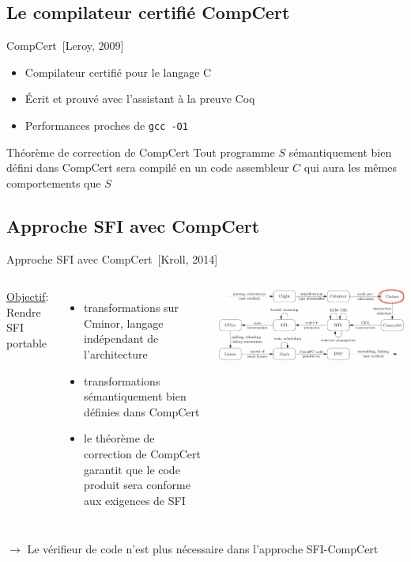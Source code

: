\documentclass[10pt,usenames,dvipsnames]{beamer}
\begin{document}
\subsection{Le compilateur certifié CompCert}
\begin{frame}{CompCert~[Leroy, 2009]}
	\begin{itemize}
		\item Compilateur certifié pour le langage C
		\item \'Ecrit et prouvé avec l'assistant à la preuve Coq
		\item Performances proches de \texttt{gcc -O1} 
	\end{itemize}
	\begin{block}{Théorème de correction de CompCert}
		Tout programme $S$ sémantiquement bien défini dans CompCert sera compilé en un code assembleur $C$ qui aura les mêmes comportements que $S$
	\end{block}
\end{frame}

\subsection{Approche SFI avec CompCert}

\begin{frame}{Approche SFI avec CompCert~[Kroll, 2014]}
	\begin{columns}
			{\large\underline{Objectif}: Rendre SFI portable}
			\vspace{5mm}
			\begin{itemize}
				\item transformations sur Cminor, langage indépendant de l'architecture
				\item transformations sémantiquement bien définies dans CompCert
				\item le théorème de correction de CompCert garantit que le code produit sera conforme aux exigences de SFI\\
			\end{itemize}
			\includegraphics[width=\textwidth]{compcert_pass.png}	
	\end{columns}
	\vspace{5mm}
	$\rightarrow$ Le vérifieur de code n'est plus nécessaire dans l'approche SFI-CompCert
\end{frame}
\end{document}
